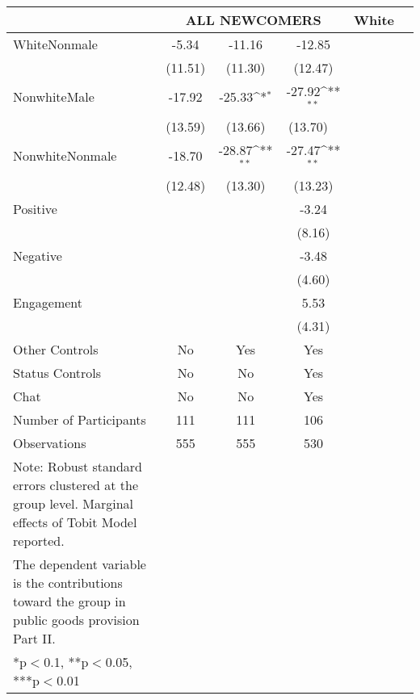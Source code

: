 {\tiny
\def\sym#1{\ifmmode^{#1}\else\(^{#1}\)\fi}
\begin{tabular}{l*{7}{c}}
\toprule
          & \multicolumn{3}{c}{ALL NEWCOMERS}   &\multicolumn{3}{c}{White}     \\
\midrule
WhiteNonmale  &  -5.34          &  -11.16  &  -12.85     \\
                    &  (11.51)       &  (11.30)  &  (12.47)    \\
\addlinespace
NonwhiteMale  &  -17.92       &   -25.33\sym{*}    &  -27.92\sym{**}     \\
                    &   (13.59)      & (13.66)             &  (13.70)     \ \\
\addlinespace
NonwhiteNonmale  &  -18.70      &   -28.87\sym{**}    &  -27.47\sym{**}     \\
                        &      (12.48)   & (13.30)              &  (13.23)   \\
                        
\addlinespace
Positive                 &         &         &  -3.24     \\
                         &           &      &  (8.16)   \\
\addlinespace
Negative                 &     &        &  -3.48  \\
                          &    &     &  (4.60)    \\
\addlinespace
Engagement                 &     &         & 5.53    \\
                              &     &         &  (4.31)   \\

\midrule
Other Controls   &   No &  Yes &    Yes    \\
Status Controls &   No  &    No    &    Yes    \\
Chat          &    No    &    No   &    Yes          \\
\midrule
Number of Participants & 111   &    111 &    106    \\
\midrule
Observations          &   555   &  555  &  530         \\
\bottomrule
Note: Robust standard errors clustered at the group level. Marginal effects of Tobit Model reported. \\
The dependent variable is the contributions toward the group in public goods provision Part II. \\
*p$<$0.1, **p$<$0.05, ***p$<$0.01
\end{tabular}
}